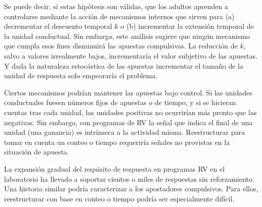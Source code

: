 \documentclass[a4paper,12pt]{article}
\begin{document}
Se puede decir, si estas hipótesis son válidas, que los adultos aprenden a controlarse mediante la acción de mecanismos internos que sirven para (a) decrementar el descuento temporal $k$ o (b) incrementar la extensión temporal de la unidad conductual. Sin embargo, este análisis sugiere que ningún mecanismo que cumpla esos fines disminuirá las apuestas compulsivas. La reducción de $k$, salvo a valores irrealmente bajos, incrementaría el valor subjetivo de las apuestas. Y dada la naturaleza estocástica de las apuestas incrementar el tamaño de la unidad de respuesta solo empeoraría el problema.

Ciertos mecanismos podrían mantener las apuestas bajo control. Si las unidades conductuales fuesen números fijos de apuestas o de tiempo, y si se hicieran cuentas tras cada unidad, las unidades positivas no ocurrirían más pronto que las negativas. Sin embargo, con programas de RV la señal que indica el final de una unidad (una ganancia) es intrínseca a la actividad misma. Reestructurar para tomar en cuenta un conteo o tiempo requeriría señales no provistas en la situación de apuesta.

La expansión gradual del requisito de respuesta en programas RV en el laboratorio ha llevado a soportar cientos o miles de respuestas sin reforzamiento. Una historia similar podría caracterizar a los apostadores compulsivos. Para ellos, reestructurar con base en conteo o tiempo podría ser especialmente difícil.
\end{document}
